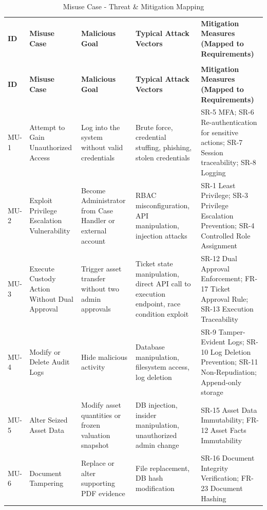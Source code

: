 \documentclass[12pt,a4paper]{report}
\begin{document}
\begin{longtable}{|p{1.2cm}|p{3.2cm}|p{3.2cm}|p{3.8cm}|p{4.5cm}|}
\caption{Misuse Case - Threat \& Mitigation Mapping}
\\\hline
\textbf{ID} & \textbf{Misuse Case} & \textbf{Malicious Goal} & \textbf{Typical Attack Vectors} & \textbf{Mitigation Measures (Mapped to Requirements)} \\
\\\hline
\endfirsthead

\hline
\textbf{ID} & \textbf{Misuse Case} & \textbf{Malicious Goal} & \textbf{Typical Attack Vectors} & \textbf{Mitigation Measures (Mapped to Requirements)} \\
\hline
\endhead

MU-1 & Attempt to Gain Unauthorized Access & Log into the system without valid credentials & Brute force, credential stuffing, phishing, stolen credentials & SR-5 MFA; SR-6 Re-authentication for sensitive actions; SR-7 Session traceability; SR-8 Logging \\
\hline

MU-2 & Exploit Privilege Escalation Vulnerability & Become Administrator from Case Handler or external account & RBAC misconfiguration, API manipulation, injection attacks & SR-1 Least Privilege; SR-3 Privilege Escalation Prevention; SR-4 Controlled Role Assignment \\
\hline

MU-3 & Execute Custody Action Without Dual Approval & Trigger asset transfer without two admin approvals & Ticket state manipulation, direct API call to execution endpoint, race condition exploit & SR-12 Dual Approval Enforcement; FR-17 Ticket Approval Rule; SR-13 Execution Traceability \\
\hline

MU-4 & Modify or Delete Audit Logs & Hide malicious activity & Database manipulation, filesystem access, log deletion & SR-9 Tamper-Evident Logs; SR-10 Log Deletion Prevention; SR-11 Non-Repudiation; Append-only storage \\
\hline

MU-5 & Alter Seized Asset Data & Modify asset quantities or frozen valuation snapshot & DB injection, insider manipulation, unauthorized admin change & SR-15 Asset Data Immutability; FR-12 Asset Facts Immutability \\
\hline

MU-6 & Document Tampering & Replace or alter supporting PDF evidence & File replacement, DB hash modification & SR-16 Document Integrity Verification; FR-23 Document Hashing \\
\hline


\end{longtable}
\end{document}
